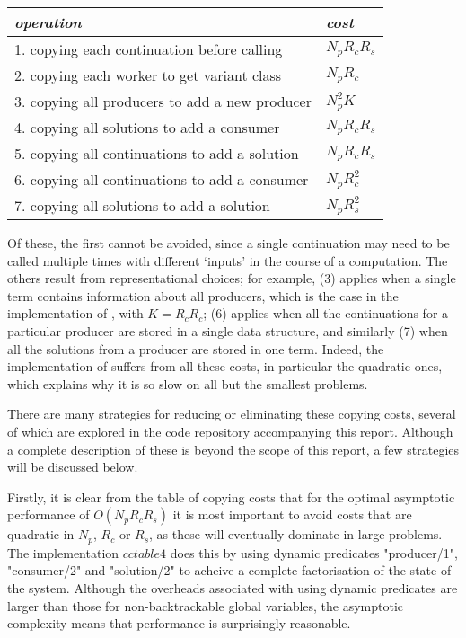 \begin{center}
\begin{tabular}{ll}
  \emph{operation} & \emph{cost} \\
  \hline
  1. copying each continuation before calling    & $N_p R_c R_s$ \\
  2. copying each worker to get variant class    & $N_p R_c$ \\
  3. copying all producers to add a new producer & $N_p^2 K $ \\
  4. copying all solutions to add a consumer     & $N_p R_c R_s$ \\
  5. copying all continuations to add a solution & $N_p R_c R_s$ \\
  6. copying all continuations to add a consumer & $N_p R_c^2$ \\
  7. copying all solutions to add a solution     & $N_p R_s^2$ \\
\end{tabular}
\end{center}
%
Of these, the first cannot be avoided, since a single continuation may need to
be called multiple times with different `inputs' in the course of a computation.
The others result from representational choices; for example, (3) applies when
a single term contains information about all producers, which is the case
in the implementation of , with $K = R_c R_c$; (6) applies
when all the continuations for a particular producer are stored in a single
data structure, and similarly (7) when all the solutions from a producer are
stored in one term. Indeed, the implementation of  suffers from
all these costs, in particular the quadratic ones, which explains why it is so slow
on all but the smallest problems.

There are many strategies for reducing or eliminating these copying costs,
several of which are explored in the code repository accompanying this report.
Although a complete description of these is beyond the scope of this report, a few
strategies will be discussed below.

Firstly, it is clear from the table of copying costs that for the optimal asymptotic 
performance of $O(N_p R_c R_s)$ it is most important to avoid costs that are quadratic 
in $N_p$, $R_c$ or $R_s$, as these will eventually dominate in large problems.
The implementation $cctable4$ does this by using dynamic predicates "producer/1",
"consumer/2" and "solution/2" to acheive a complete factorisation of the state of
the system. Although the overheads associated with using dynamic predicates are larger
than those for non-backtrackable global variables, the asymptotic complexity means
that performance is surprisingly reasonable.

